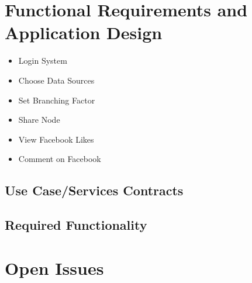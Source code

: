 \documentclass[hidelinks,english]{article}
\begin{document}
	
	\section{Functional Requirements and Application Design}
	
		\begin{itemize}
		\item Login System
		\item Choose Data Sources
		\item Set Branching Factor
		\item Share Node
		\item View Facebook Likes
		\item Comment on Facebook
		\end{itemize}
		
		
		\subsection{Use Case/Services Contracts}
	
	
		\subsection{Required Functionality}
	
	
	\section{Open Issues}
	
\end{document}
